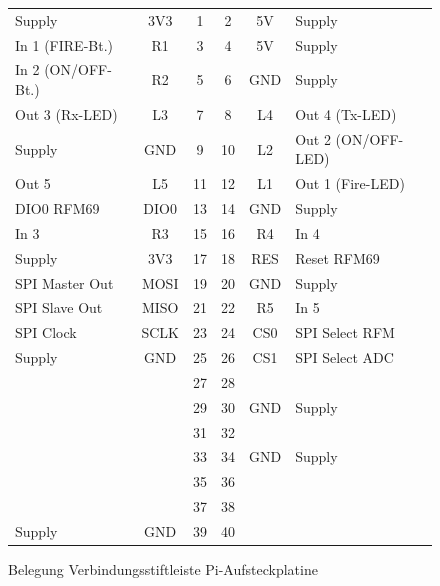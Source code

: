 \documentclass[paper=a4, parskip, numbers=noenddot, toc=listof, headsepline]{scrbook}
\begin{document}
		  \begin{figure}
			  \centering
			  \begin{tabularx}{\textwidth}{Xc|cc|cX}
				  \cline{3-4}
				  Supply            & 3V3  & 1  & 2  & 5V  & Supply             \\
				  In 1 (FIRE-Bt.)   & R1   & 3  & 4  & 5V  & Supply             \\
				  In 2 (ON/OFF-Bt.) & R2   & 5  & 6  & GND & Supply             \\
				  Out 3 (Rx-LED)    & L3   & 7  & 8  & L4  & Out 4 (Tx-LED)     \\
				  Supply            & GND  & 9  & 10 & L2  & Out 2 (ON/OFF-LED) \\
				  Out 5             & L5   & 11 & 12 & L1  & Out 1 (Fire-LED)   \\
				  DIO0 RFM69        & DIO0 & 13 & 14 & GND & Supply             \\
				  In 3              & R3   & 15 & 16 & R4  & In 4               \\
				  Supply            & 3V3  & 17 & 18 & RES & Reset RFM69        \\
				  SPI Master Out    & MOSI & 19 & 20 & GND & Supply             \\
				  SPI Slave Out     & MISO & 21 & 22 & R5  & In 5               \\
				  SPI Clock         & SCLK & 23 & 24 & CS0 & SPI Select RFM     \\
				  Supply            & GND  & 25 & 26 & CS1 & SPI Select ADC     \\
				  ~                 &      & 27 & 28 &     &                    \\
				  ~                 &      & 29 & 30 & GND & Supply             \\
				  ~                 &      & 31 & 32 &     &                    \\
				  ~                 &      & 33 & 34 & GND & Supply             \\
				  ~                 &      & 35 & 36 &     &                    \\
				  ~                 &      & 37 & 38 &     &                    \\
				  Supply            & GND  & 39 & 40 &     &                    \\ \cline{3-4}
			  \end{tabularx}
			  \caption{Belegung Verbindungsstiftleiste Pi-Aufsteckplatine}
			  \label{fig:piheader}
		  \end{figure}
\end{document}
